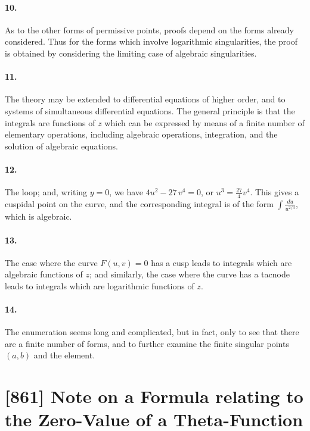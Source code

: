 \documentclass[11pt,a4paper]{book}
\begin{document}
\paragraph{10.} As to the other forms of permissive points, proofs depend on the forms already considered. Thus for the forms which involve logarithmic singularities, the proof is obtained by considering the limiting case of algebraic singularities.

\paragraph{11.} The theory may be extended to differential equations of higher order, and to systems of simultaneous differential equations. The general principle is that the integrals are functions of $z$ which can be expressed by means of a finite number of elementary operations, including algebraic operations, integration, and the solution of algebraic equations.

\paragraph{12.} The loop; and, writing $y = 0$, we have $4u^{2} - 27\,v^{4} = 0$, or $u^{3} = \frac{27}{4}v^{4}$. This gives a cuspidal point on the curve, and the corresponding integral is of the form $\int \frac{du}{u^{2/3}}$, which is algebraic.

\paragraph{13.} The case where the curve $F(u, v) = 0$ has a cusp leads to integrals which are algebraic functions of $z$; and similarly, the case where the curve has a tacnode leads to integrals which are logarithmic functions of $z$.

\paragraph{14.} The enumeration seems long and complicated, but in fact, only to see that there are a finite number of forms, and to further examine the finite singular points $(a, b)$ and the element.

\newpage
\section*{[861] Note on a Formula relating to the Zero-Value of a Theta-Function}
\end{document}
